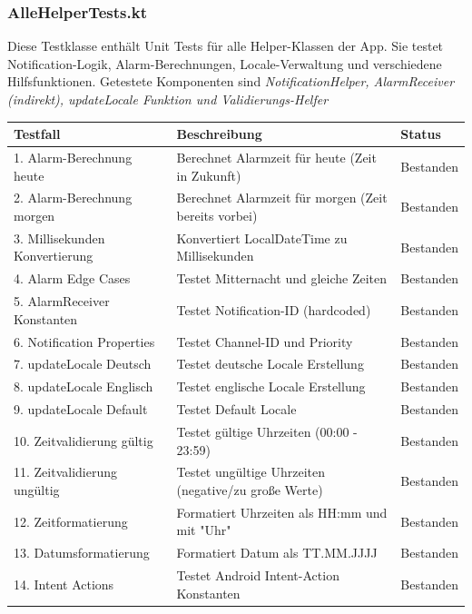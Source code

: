 \subsubsection{AlleHelperTests.kt}
Diese Testklasse enthält Unit Tests für alle Helper-Klassen der App. Sie testet Notification-Logik, Alarm-Berechnungen, Locale-Verwaltung und verschiedene Hilfsfunktionen.
Getestete Komponenten sind \textit{NotificationHelper, AlarmReceiver (indirekt), updateLocale Funktion und Validierungs-Helfer}\\
\vspace{1em}

\begin{tabularx}{\textwidth}{|l|X|l|}
\hline
\textbf{Testfall} & \textbf{Beschreibung} & \textbf{Status} \\
\hline
1. Alarm-Berechnung heute & Berechnet Alarmzeit für heute (Zeit in Zukunft) & Bestanden\\
\hline
2. Alarm-Berechnung morgen & Berechnet Alarmzeit für morgen (Zeit bereits vorbei) & Bestanden\\
\hline
3. Millisekunden Konvertierung & Konvertiert LocalDateTime zu Millisekunden & Bestanden\\
\hline
4. Alarm Edge Cases & Testet Mitternacht und gleiche Zeiten & Bestanden\\
\hline
5. AlarmReceiver Konstanten & Testet Notification-ID (hardcoded) & Bestanden\\
\hline
6. Notification Properties & Testet Channel-ID und Priority & Bestanden\\
\hline
7. updateLocale Deutsch & Testet deutsche Locale Erstellung & Bestanden\\
\hline
8. updateLocale Englisch & Testet englische Locale Erstellung & Bestanden\\
\hline
9. updateLocale Default & Testet Default Locale & Bestanden\\
\hline
10. Zeitvalidierung gültig & Testet gültige Uhrzeiten (00:00 - 23:59) & Bestanden\\
\hline
11. Zeitvalidierung ungültig & Testet ungültige Uhrzeiten (negative/zu große Werte) & Bestanden\\
\hline
12. Zeitformatierung & Formatiert Uhrzeiten als HH:mm und mit "Uhr" & Bestanden\\
\hline
13. Datumsformatierung & Formatiert Datum als TT.MM.JJJJ & Bestanden\\
\hline
14. Intent Actions & Testet Android Intent-Action Konstanten & Bestanden\\

\end{tabularx}
